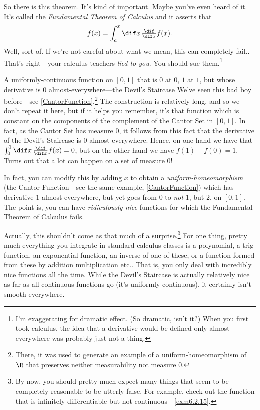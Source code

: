 So there is this theorem.  It's kind of important.  Maybe you've even heard of it.  It's called the \emph{Fundamental Theorem of Calculus} and it asserts that
\begin{equation}
f(x)=\int _a^x\dif x\, \tfrac{\dif}{\dif x}f(x).
\end{equation}
Well, sort of.  If we're not careful about what we mean, this can completely fail..  That's right---your calculus teachers \emph{lied to you}.  You should sue them.\footnote{I'm exaggerating for dramatic effect.  (So dramatic, isn't it?)  When you first took calculus, the idea that a derivative would be defined only almost-everywhere was probably just not a thing.}
\begin{exm}{A uniformly-continuous function on {$[0,1]$} that is $0$ at $0$, $1$ at $1$, but whose derivative is $0$ almost-everywhere---the Devil's Staircase}{}
We've seen this bad boy before---see \cref{CantorFunction}.\footnote{There, it was used to generate an example of a uniform-homeomorphism of $\R$ that preserves neither measurability not measure $0$.}  The construction is relatively long, and so we don't repeat it here, but if it helps you remember, it's that function which is constant on the components of the complement of the Cantor Set in $[0,1]$.  In fact, as the Cantor Set has measure $0$, it follows from this fact that the derivative of the Devil's Staircase is $0$ almost-everywhere.  Hence, on one hand we have that $\int _0^1\dif x\, \frac{\dif}{\dif x}f(x)=0$, but on the other hand we have $f(1)-f(0)=1$.  Turns out that a lot can happen on a set of measure $0$!

In fact, you can modify this by adding $x$ to obtain a \emph{uniform-homeomorphism} (the Cantor Function---see the same example, \cref{CantorFunction}) which has derivative $1$ almost-everywhere, but yet goes from $0$ to \emph{not} $1$, but $2$, on $[0,1]$.  The point is, you can have \emph{ridiculously nice} functions for which the Fundamental Theorem of Calculus fails.
\end{exm}
Actually, this shouldn't come as that much of a surprise.\footnote{By now, you should pretty much expect many things that seem to be completely reasonable to be utterly false.  For example, check out the function that is infinitely-differentiable but not continuous---\cref{exm6.2.15}.}  For one thing, pretty much everything you integrate in standard calculus classes is a polynomial, a trig function, an exponential function, an inverse of one of these, or a function formed from these by addition multiplication etc..  That is, you only deal with incredibly nice functions all the time.  While the Devil's Staircase is actually relatively nice as far as all continuous functions go (it's uniformly-continuous), it certainly isn't smooth everywhere.

